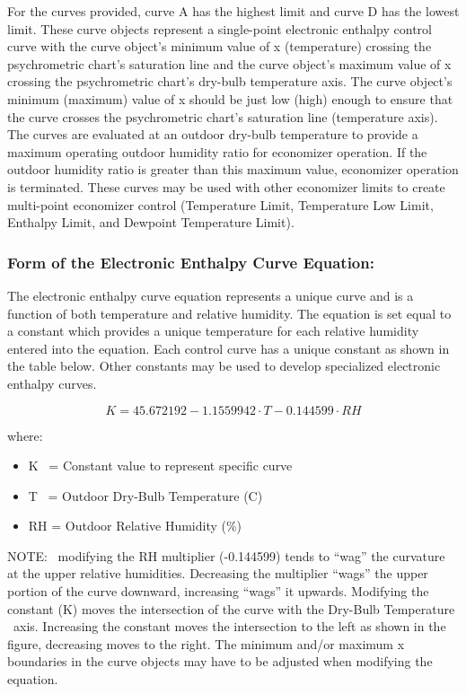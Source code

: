 For the curves provided, curve A has the highest limit and curve D has the lowest limit. These curve objects represent a single-point electronic enthalpy control curve with the curve object's minimum value of x (temperature) crossing the psychrometric chart's saturation line and the curve object's maximum value of x crossing the psychrometric chart's dry-bulb temperature axis. The curve object's minimum (maximum) value of x should be just low (high) enough to ensure that the curve crosses the psychrometric chart's saturation line (temperature axis). The curves are evaluated at an outdoor dry-bulb temperature to provide a maximum operating outdoor humidity ratio for economizer operation. If the outdoor humidity ratio is greater than this maximum value, economizer operation is terminated. These curves may be used with other economizer limits to create multi-point economizer control (Temperature Limit, Temperature Low Limit, Enthalpy Limit, and Dewpoint Temperature Limit).

\subsubsection{Form of the Electronic Enthalpy Curve Equation:}\label{form-of-the-electronic-enthalpy-curve-equation}

The electronic enthalpy curve equation represents a unique curve and is a function of both temperature and relative humidity. The equation is set equal to a constant which provides a unique temperature for each relative humidity entered into the equation. Each control curve has a unique constant as shown in the table below. Other constants may be used to develop specialized electronic enthalpy curves.

\begin{equation}
K = 45.672192 - 1.1559942 \cdot T - 0.144599 \cdot RH
\end{equation}

where:

\begin{itemize}
\tightlist
\item
  K~ = Constant value to represent specific curve
\item
  T~ = Outdoor Dry-Bulb Temperature (C)
\item
  RH = Outdoor Relative Humidity (\%)
\end{itemize}

NOTE:~ modifying the RH multiplier (-0.144599) tends to ``wag'' the curvature at the upper relative humidities. Decreasing the multiplier ``wags'' the upper portion of the curve downward, increasing ``wags'' it upwards. Modifying the constant (K) moves the intersection of the curve with the Dry-Bulb Temperature ~axis. Increasing the constant moves the intersection to the left as shown in the figure, decreasing moves to the right. The minimum and/or maximum x boundaries in the curve objects may have to be adjusted when modifying the equation.

